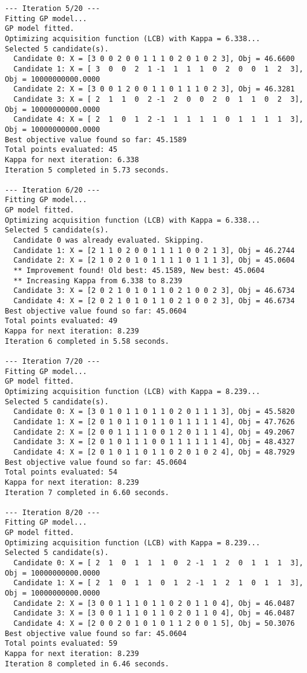 \documentclass[
  letterpaper,
  DIV=11,
  numbers=noendperiod]{scrartcl}
\begin{document}
\begin{verbatim}
--- Iteration 5/20 ---
Fitting GP model...
GP model fitted.
Optimizing acquisition function (LCB) with Kappa = 6.338...
Selected 5 candidate(s).
  Candidate 0: X = [3 0 0 2 0 0 1 1 1 0 2 0 1 0 2 3], Obj = 46.6600
  Candidate 1: X = [ 3  0  0  2  1 -1  1  1  1  0  2  0  0  1  2  3], Obj = 10000000000.0000
  Candidate 2: X = [3 0 0 1 2 0 0 1 1 0 1 1 1 0 2 3], Obj = 46.3281
  Candidate 3: X = [ 2  1  1  0  2 -1  2  0  0  2  0  1  1  0  2  3], Obj = 10000000000.0000
  Candidate 4: X = [ 2  1  0  1  2 -1  1  1  1  1  0  1  1  1  1  3], Obj = 10000000000.0000
Best objective value found so far: 45.1589
Total points evaluated: 45
Kappa for next iteration: 6.338
Iteration 5 completed in 5.73 seconds.

--- Iteration 6/20 ---
Fitting GP model...
GP model fitted.
Optimizing acquisition function (LCB) with Kappa = 6.338...
Selected 5 candidate(s).
  Candidate 0 was already evaluated. Skipping.
  Candidate 1: X = [2 1 1 0 2 0 0 1 1 1 1 0 0 2 1 3], Obj = 46.2744
  Candidate 2: X = [2 1 0 2 0 1 0 1 1 1 1 0 1 1 1 3], Obj = 45.0604
  ** Improvement found! Old best: 45.1589, New best: 45.0604
  ** Increasing Kappa from 6.338 to 8.239
  Candidate 3: X = [2 0 2 1 0 1 0 1 1 0 2 1 0 0 2 3], Obj = 46.6734
  Candidate 4: X = [2 0 2 1 0 1 0 1 1 0 2 1 0 0 2 3], Obj = 46.6734
Best objective value found so far: 45.0604
Total points evaluated: 49
Kappa for next iteration: 8.239
Iteration 6 completed in 5.58 seconds.

--- Iteration 7/20 ---
Fitting GP model...
GP model fitted.
Optimizing acquisition function (LCB) with Kappa = 8.239...
Selected 5 candidate(s).
  Candidate 0: X = [3 0 1 0 1 1 0 1 1 0 2 0 1 1 1 3], Obj = 45.5820
  Candidate 1: X = [2 0 1 0 1 1 0 1 1 0 1 1 1 1 1 4], Obj = 47.7626
  Candidate 2: X = [2 0 0 1 1 1 1 0 0 1 2 0 1 1 1 4], Obj = 49.2067
  Candidate 3: X = [2 0 1 0 1 1 1 0 0 1 1 1 1 1 1 4], Obj = 48.4327
  Candidate 4: X = [2 0 1 0 1 1 0 1 1 0 2 0 1 0 2 4], Obj = 48.7929
Best objective value found so far: 45.0604
Total points evaluated: 54
Kappa for next iteration: 8.239
Iteration 7 completed in 6.60 seconds.

--- Iteration 8/20 ---
Fitting GP model...
GP model fitted.
Optimizing acquisition function (LCB) with Kappa = 8.239...
Selected 5 candidate(s).
  Candidate 0: X = [ 2  1  0  1  1  1  0  2 -1  1  2  0  1  1  1  3], Obj = 10000000000.0000
  Candidate 1: X = [ 2  1  0  1  1  0  1  2 -1  1  2  1  0  1  1  3], Obj = 10000000000.0000
  Candidate 2: X = [3 0 0 1 1 1 0 1 1 0 2 0 1 1 0 4], Obj = 46.0487
  Candidate 3: X = [3 0 0 1 1 1 0 1 1 0 2 0 1 1 0 4], Obj = 46.0487
  Candidate 4: X = [2 0 0 2 0 1 0 1 0 1 1 2 0 0 1 5], Obj = 50.3076
Best objective value found so far: 45.0604
Total points evaluated: 59
Kappa for next iteration: 8.239
Iteration 8 completed in 6.46 seconds.


\end{verbatim}
\end{document}
